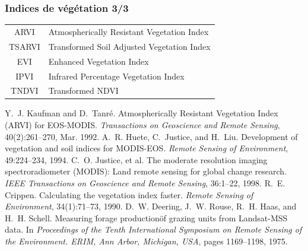 \documentclass[compress,handout]{beamer}
\begin{document}
\begin{frame}
\frametitle{Indices de végétation 3/3}
\footnotesize \centering
\begin{tabular}{|c|l|}
\hline
ARVI & Atmospherically Resistant  Vegetation Index \cite{ARVI} \\
TSARVI & Transformed Soil Adjusted Vegetation Index   \cite{ARVI} \\
EVI & Enhanced Vegetation Index \cite{Huete1994-EVI,Justice1998-EVI} \\
IPVI & Infrared Percentage Vegetation Index  \cite{Crippen1990-IPVI} \\
TNDVI & Transformed NDVI  \cite{Deering1975-TNDVI} \\
\hline
\end{tabular}
\begin{thebibliography}{noidea}
\tiny
{}
Y.~J. Kaufman and D.~Tanr\'e.
 {Atmospherically Resistant Vegetation Index (ARVI) for EOS-MODIS}.
 {\em Transactions on Geoscience and Remote Sensing}, 40(2):261--270,
  Mar. 1992.
A.~R. Huete, C.~Justice, and H.~Liu.
 Development of vegetation and soil indices for {MODIS-EOS}.
 {\em Remote Sensing of Environment}, 49:224--234, 1994.
C.~O. Justice, et al.
 The moderate resolution imaging spectroradiometer ({MODIS}): Land
  remote sensing for global change research.
 {\em IEEE Transactions on Geoscience and Remote Sensing}, 36:1--22,
  1998.
R.~E. Crippen.
 Calculating the vegetation index faster.
 {\em Remote Sensing of Environment}, 34(1):71--73, 1990.
D.~W. Deering, J.~W. Rouse, R.~H. Haas, and H.~H. Schell.
 Measuring \"forage production\" of grazing units from {L}andsat-{MSS}
  data.
 In {\em Proceedings of the Tenth International Symposium on Remote
  Sensing of the Environment. ERIM, Ann Arbor, Michigan, USA}, pages
  1169--1198, 1975.
\end{thebibliography}
\end{frame}
\end{document}
